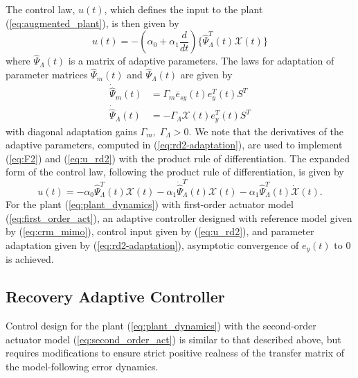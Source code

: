 The control law, $u(t)$, which defines the input to the plant (\ref{eq:augmented_plant}), is then given by
\begin{equation}
u(t) = - (\alpha_0 + \alpha_1 \frac{d}{dt}) \big \{ \hat{\Psi}_{\Lambda}^T (t) \mathcal{X}(t) \big\} \label{eq:u_rd2}	
\end{equation}
where $\hat{\Psi}_{\Lambda}(t)$ is a matrix of adaptive parameters. The laws for adaptation of parameter matrices $\hat{\Psi}_m(t)$ and $\hat{\Psi}_{\Lambda}(t)$ are given by
\begin{equation}
\begin{aligned}
	\dot{\hat{\Psi}}_m(t) &= \Gamma_{m} \overline{e}_{sy}(t) e_y^T(t) S^T \\
	\dot{\hat{\Psi}}_{\Lambda}(t) &= -\Gamma_{\Lambda} \mathcal{X}(t) e_y^T (t) S^T
\end{aligned} \label{eq:rd2-adaptation}
\end{equation}
with diagonal adaptation gains $\Gamma_{m}, \;\Gamma_{\Lambda} > 0$. We note that the derivatives of the adaptive parameters, computed in (\ref{eq:rd2-adaptation}), are used to implement (\ref{eq:F2}) and (\ref{eq:u_rd2}) with the product rule of differentiation. The expanded form of the control law, following the product rule of differentiation, is given by
\begin{equation}
u(t) = - \alpha_0 \hat{\Psi}_{\Lambda}^T (t) \mathcal{X}(t) - \alpha_1 \dot{\hat{\Psi}}_{\Lambda}^T (t) \mathcal{X}(t) - \alpha_1 \hat{\Psi}_{\Lambda}^T (t) \dot{\mathcal{X}}(t).
\end{equation}
For the plant (\ref{eq:plant_dynamics}) with first-order actuator model (\ref{eq:first_order_act}), an adaptive controller designed with reference model given by (\ref{eq:crm_mimo}), control input given by (\ref{eq:u_rd2}), and parameter adaptation given by (\ref{eq:rd2-adaptation}), asymptotic convergence of $e_y(t)$ to 0 is achieved.

\subsection{Recovery Adaptive Controller}
Control design for the plant (\ref{eq:plant_dynamics}) with the second-order actuator model (\ref{eq:second_order_act}) is similar to that described above, but requires modifications to ensure strict positive realness of the transfer matrix of the model-following error dynamics. 

